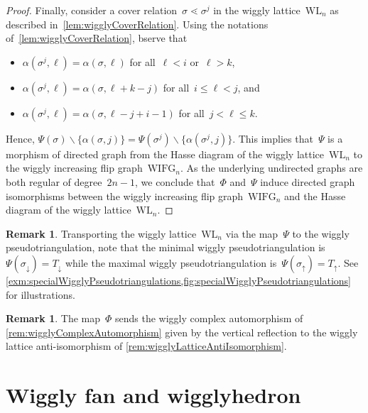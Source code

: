 \documentclass{amsart}
\theoremstyle{definition}
\newtheorem{remark}[theorem]{Remark}
\newcommand{\ssm}{\smallsetminus} %
\newcommand{\wigglyIncreasingFlipGraph}{\mathrm{WIFG}} %
\newcommand{\wigglyLattice}{\mathrm{WL}} %
\begin{document}
\begin{proof}
Finally, consider a cover relation~$\sigma \lessdot \sigma^j$ in the wiggly lattice~$\wigglyLattice_n$ as described in~\cref{lem:wigglyCoverRelation}.
Using the notations of~\cref{lem:wigglyCoverRelation}, bserve that
\begin{itemize}
\item $\alpha(\sigma^j, \ell) = \alpha(\sigma, \ell)$ for all~$\ell < i$ or~$\ell > k$,
\item $\alpha(\sigma^j, \ell) = \alpha(\sigma, \ell+k-j)$ for all~$i \le \ell < j$, and
\item $\alpha(\sigma^j, \ell) = \alpha(\sigma, \ell-j+i-1)$ for all~$j < \ell \le k$.
\end{itemize}
Hence, $\Psi(\sigma) \ssm \{\alpha(\sigma, j)\} = \Psi(\sigma^j) \ssm \{\alpha(\sigma^j, j)\}$.
This implies that~$\Psi$ is a morphism of directed graph from the Hasse diagram of the wiggly lattice~$\wigglyLattice_n$ to the wiggly increasing flip graph~$\wigglyIncreasingFlipGraph_n$.
As the underlying undirected graphs are both regular of degree~$2n-1$, we conclude that~$\Phi$ and~$\Psi$ induce directed graph isomorphisms between the wiggly increasing flip graph~$\wigglyIncreasingFlipGraph_n$ and the Hasse diagram of the wiggly lattice~$\wigglyLattice_n$.
\end{proof}

\begin{remark}
Transporting the wiggly lattice~$\wigglyLattice_n$ via the map~$\Psi$ to the wiggly pseudotriangulation, note that the minimal wiggly pseudotriangulation is~$\Psi(\sigma_\downarrow) = T_\downarrow$ while the maximal wiggly pseudotriangulation is~$\Psi(\sigma_\uparrow) = T_\uparrow$. See \cref{exm:specialWigglyPseudotriangulations,fig:specialWigglyPseudotriangulations} for illustrations.
\end{remark}

\begin{remark}
The map~$\Phi$ sends the wiggly complex automorphism of \cref{rem:wigglyComplexAutomorphism} given by the vertical reflection to the wiggly lattice anti-isomorphism of \cref{rem:wigglyLatticeAntiIsomorphism}.
\end{remark}


\section{Wiggly fan and wigglyhedron}
\label{sec:geometry}
\end{document}
